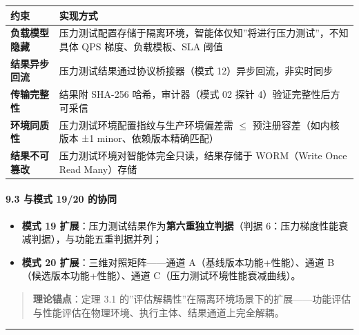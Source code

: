 {\def\LTcaptype{} %
\begin{longtable}[]{@{}
  >{\raggedright\arraybackslash}p{}
  >{\raggedright\arraybackslash}p{}@{}}
\toprule\noalign{}
\begin{minipage}[b]{\linewidth}\raggedright
约束
\end{minipage} & \begin{minipage}[b]{\linewidth}\raggedright
实现方式
\end{minipage} \\
\midrule\noalign{}
\endhead
\bottomrule\noalign{}
\endlastfoot
\textbf{负载模型隐藏} &
压力测试配置存储于隔离环境，智能体仅知''将进行压力测试''，不知具体 QPS
梯度、负载模板、SLA 阈值 \\
\textbf{结果异步回流} & 压力测试结果通过协议桥接器（模式
12）异步回流，非实时同步 \\
\textbf{传输完整性} & 结果附 SHA-256 哈希，审计器（模式 02 探针
4）验证完整性后方可采信 \\
\textbf{环境同质性} & 压力测试环境配置指纹与生产环境偏差需 \(\le\)
预注册容差（如内核版本 ±1 minor、依赖版本精确匹配） \\
\textbf{结果不可篡改} & 压力测试环境对智能体完全只读，结果存储于
WORM（Write Once Read Many）存储 \\
\end{longtable}
}

\paragraph{9.3 与模式 19/20
的协同}\label{ux4e0eux6a21ux5f0f-1920-ux7684ux534fux540c}

\begin{itemize}
\tightlist
\item
  \textbf{模式 19 扩展}：压力测试结果作为\textbf{第六重独立判据}（判据
  6：压力梯度性能衰减判据），与功能五重判据并列；
\item
  \textbf{模式 20 扩展}：三维对照矩阵------通道
  A（基线版本功能+性能）、通道 B（候选版本功能+性能）、通道
  C（压力测试环境性能衰减曲线）。
\end{itemize}

\begin{quote}
\textbf{理论锚点}：定理 3.1
的''评估解耦性''在隔离环境场景下的扩展------功能评估与性能评估在物理环境、执行主体、结果通道上完全解耦。
\end{quote}

\begin{center}\rule{0.5\linewidth}{0.5pt}\end{center}

